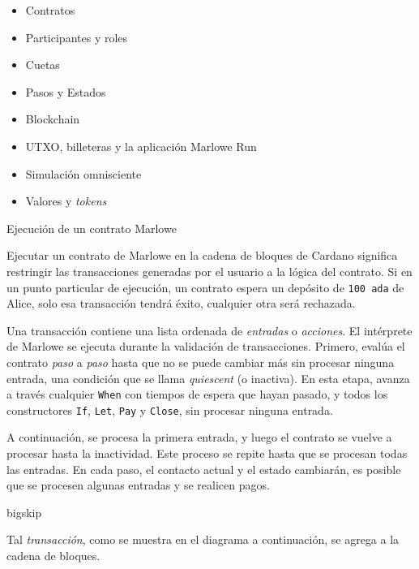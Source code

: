 \documentclass{beamer}
\begin{document}
\begin{frame}
\begin{itemize}
    \item Contratos
    \item Participantes y roles
    \item Cuetas
    \item Pasos y Estados
    \item Blockchain
    \item UTXO, billeteras y la aplicación Marlowe Run
    \item Simulación omnisciente
    \item Valores y \textit{tokens}

\end{itemize}

\end{frame}

\begin{frame}{Ejecución de un contrato Marlowe}

Ejecutar un contrato de Marlowe en la cadena de bloques de Cardano significa restringir las transacciones generadas por el usuario a la lógica del contrato. Si en un punto particular de ejecución, un contrato espera un depósito de \texttt{100 ada} de Alice, solo esa transacción tendrá éxito, cualquier otra será rechazada.

\bigskip
\pause

Una transacción contiene una lista ordenada de \textit{entradas} o \textit{acciones}. El intérprete de Marlowe se ejecuta durante la validación de transacciones. Primero, evalúa el contrato \textit{paso} a \textit{paso} hasta que no se puede cambiar más sin procesar ninguna entrada, una condición que se llama \textit{quiescent} (o inactiva). En esta etapa, avanza a través cualquier \texttt{When} con tiempos de espera que hayan pasado, y todos los constructores \texttt{If}, \texttt{Let}, \texttt{Pay} y \texttt{Close}, sin procesar ninguna entrada.

\end{frame}

\begin{frame}
A continuación, se procesa la primera entrada, y luego el contrato se vuelve a procesar hasta la inactividad. Este proceso se repite hasta que se procesan todas las entradas. En cada paso, el contacto actual y el estado cambiarán, es posible que se procesen algunas entradas y se realicen pagos.

bigskip

Tal \textit{transacción}, como se muestra en el diagrama a continuación, se agrega a la cadena de bloques. 

\end{frame}
\end{document}
